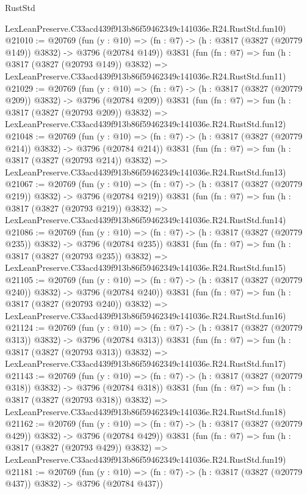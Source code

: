 \begin{lexlean}{RustStd}
\begin{coremodule}
    LexLeanPreserve.C33acd439f913b86f59462349c141036e.R24.RustStd.fun10)
@21010 := @20769
    (fun (y : @10) => (fn : @7) -> (h : @3817 (@3827 (@20779 @149)) @3832) -> @3796 (@20784 @149))
    @3831
    (fun (fn : @7) =>
    fun (h : @3817 (@3827 (@20793 @149)) @3832) =>
    LexLeanPreserve.C33acd439f913b86f59462349c141036e.R24.RustStd.fun11)
@21029 := @20769
    (fun (y : @10) => (fn : @7) -> (h : @3817 (@3827 (@20779 @209)) @3832) -> @3796 (@20784 @209))
    @3831
    (fun (fn : @7) =>
    fun (h : @3817 (@3827 (@20793 @209)) @3832) =>
    LexLeanPreserve.C33acd439f913b86f59462349c141036e.R24.RustStd.fun12)
@21048 := @20769
    (fun (y : @10) => (fn : @7) -> (h : @3817 (@3827 (@20779 @214)) @3832) -> @3796 (@20784 @214))
    @3831
    (fun (fn : @7) =>
    fun (h : @3817 (@3827 (@20793 @214)) @3832) =>
    LexLeanPreserve.C33acd439f913b86f59462349c141036e.R24.RustStd.fun13)
@21067 := @20769
    (fun (y : @10) => (fn : @7) -> (h : @3817 (@3827 (@20779 @219)) @3832) -> @3796 (@20784 @219))
    @3831
    (fun (fn : @7) =>
    fun (h : @3817 (@3827 (@20793 @219)) @3832) =>
    LexLeanPreserve.C33acd439f913b86f59462349c141036e.R24.RustStd.fun14)
@21086 := @20769
    (fun (y : @10) => (fn : @7) -> (h : @3817 (@3827 (@20779 @235)) @3832) -> @3796 (@20784 @235))
    @3831
    (fun (fn : @7) =>
    fun (h : @3817 (@3827 (@20793 @235)) @3832) =>
    LexLeanPreserve.C33acd439f913b86f59462349c141036e.R24.RustStd.fun15)
@21105 := @20769
    (fun (y : @10) => (fn : @7) -> (h : @3817 (@3827 (@20779 @240)) @3832) -> @3796 (@20784 @240))
    @3831
    (fun (fn : @7) =>
    fun (h : @3817 (@3827 (@20793 @240)) @3832) =>
    LexLeanPreserve.C33acd439f913b86f59462349c141036e.R24.RustStd.fun16)
@21124 := @20769
    (fun (y : @10) => (fn : @7) -> (h : @3817 (@3827 (@20779 @313)) @3832) -> @3796 (@20784 @313))
    @3831
    (fun (fn : @7) =>
    fun (h : @3817 (@3827 (@20793 @313)) @3832) =>
    LexLeanPreserve.C33acd439f913b86f59462349c141036e.R24.RustStd.fun17)
@21143 := @20769
    (fun (y : @10) => (fn : @7) -> (h : @3817 (@3827 (@20779 @318)) @3832) -> @3796 (@20784 @318))
    @3831
    (fun (fn : @7) =>
    fun (h : @3817 (@3827 (@20793 @318)) @3832) =>
    LexLeanPreserve.C33acd439f913b86f59462349c141036e.R24.RustStd.fun18)
@21162 := @20769
    (fun (y : @10) => (fn : @7) -> (h : @3817 (@3827 (@20779 @429)) @3832) -> @3796 (@20784 @429))
    @3831
    (fun (fn : @7) =>
    fun (h : @3817 (@3827 (@20793 @429)) @3832) =>
    LexLeanPreserve.C33acd439f913b86f59462349c141036e.R24.RustStd.fun19)
@21181 := @20769
    (fun (y : @10) => (fn : @7) -> (h : @3817 (@3827 (@20779 @437)) @3832) -> @3796 (@20784 @437))

\end{coremodule}
\end{lexlean}
